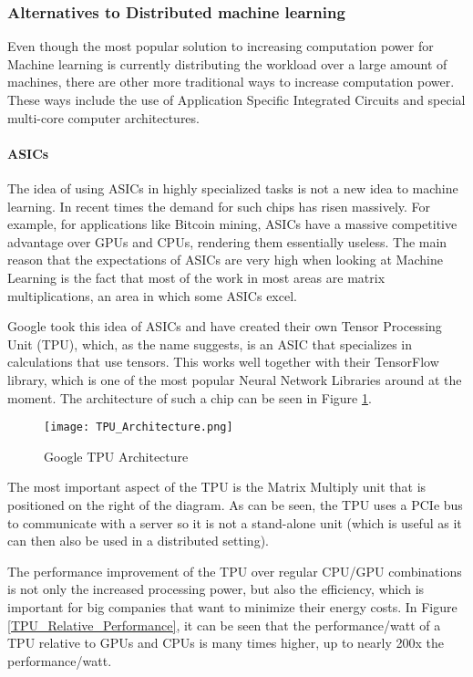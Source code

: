 
\subsubsection{Alternatives to Distributed machine learning}
Even though the most popular solution to increasing computation power for Machine
learning is currently distributing the workload over a large amount of machines,
there are other more traditional ways to increase computation power. These ways
include the use of Application Specific Integrated Circuits and special multi-core
computer architectures.

\paragraph{ASICs}
The idea of using ASICs in highly specialized tasks is not a new idea
to machine learning. In recent times the demand for such chips has risen massively\cite{Metz18}.
For example, for applications like Bitcoin mining, ASICs have a massive competitive
advantage over GPUs and CPUs, rendering them essentially useless. The main reason
that the expectations of ASICs are very high when looking at Machine
Learning is the fact that most of the work in most areas are matrix multiplications,
an area in which some ASICs excel.

Google took this idea of ASICs and have created their own Tensor Processing Unit (TPU)\cite{Sato17},
which, as the name suggests, is an ASIC that specializes in calculations that
use tensors. This works well together with their TensorFlow library, which is one
of the most popular Neural Network Libraries around at the moment. The architecture of
such a chip can be seen in Figure \ref{TPU_Architecture}.

\begin{figure}
  \texttt{[image: TPU\_Architecture.png]}
  \caption{Google TPU Architecture\cite{Joup17}}
  \label{TPU_Architecture}
\end{figure}

The most important aspect of the TPU is the Matrix Multiply unit that is positioned
on the right of the diagram. As can be seen, the TPU uses a PCIe bus to communicate
with a server so it is not a stand-alone unit (which is useful as it can then also
be used in a distributed setting).

The performance improvement of the TPU over regular CPU/GPU combinations is not only
the increased processing power, but also the efficiency, which is important
for big companies that want to minimize their energy costs. In Figure \ref{TPU_Relative_Performance},
it can be seen that the performance/watt of a TPU relative to GPUs and CPUs is many times higher,
up to nearly 200x the performance/watt.


